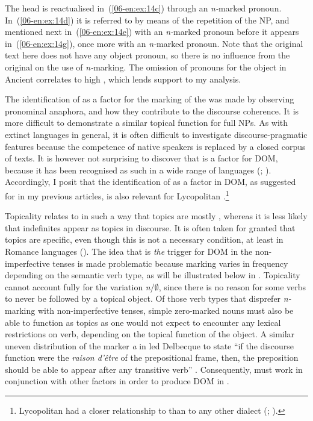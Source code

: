 \documentclass[output=paper]{LSP/langsci}
\begin{document}
The head is reactualised in~(\ref{06-en:ex:14c}) through an \textit{n-}marked pronoun. In~(\ref{06-en:ex:14d}) it is referred to by means of the repetition of the NP, and mentioned next in~(\ref{06-en:ex:14e}) with an \textit{n-}marked pronoun before it appears in~(\ref{06-en:ex:14g}), once more with an \textit{n-}marked pronoun. Note that the original  text here does not have any object pronoun, so there is no influence from the original on the use of \textit{n-}marking. The omission of pronouns for the object in Ancient  correlates to high  \citep{Luraghi2003Greek}, which lends support to my analysis.

The identification of  as a factor for the marking of the  was made by observing pronominal anaphora, and how they contribute to the discourse coherence. It is more difficult to demonstrate a similar topical function for full NPs. As with extinct languages in general, it is often difficult to investigate discourse-pragmatic features because the competence of native speakers is replaced by a closed corpus of texts. It is however not surprising to discover that  is a factor for DOM, because it has been recognised as such in a wide range of languages (\citealt[125–139]{Dalrympleetal2011Objects}; \citealt{Escandell-Vidal2009Differential,Iemmolo2010Topicality, Shainetal2010Synchrony}). Accordingly, I posit that the identification of  as a factor in DOM, as suggested for   in my previous articles, is also relevant for Lycopolitan .\footnote{Lycopolitan had a closer relationship to  than to any other  dialect (\citealt{Funk1988Dialects}; \citealt[343]{Kasser2002Lyco-diospolitain}).}

Topicality relates to  in such a way that topics are mostly , whereas it is less likely that indefinites appear as topics in discourse. It is often taken for granted that topics are specific, even though this is not a necessary condition, at least in Romance languages (\citealt[138–140]{Leonetti2013Plurals}). The idea that  is \textit{the} trigger for DOM in the non-imperfective tenses is made problematic because marking varies in frequency depending on the semantic verb type, as will be illustrated below in . Topicality cannot account fully for the variation \textit{n}/${\emptyset}$, since there is no reason for some verbs to never be followed by a topical object. Of those verb types that disprefer \textit{n-}marking with non-imperfective tenses, simple zero-marked nouns must also be able to function as topics as one would not expect to encounter any lexical restrictions on verb, depending on the topical function of the object. A similar uneven distribution of the marker \textit{a} in  led Delbecque to state “if the discourse function were the \textit{raison d’être} of the prepositional frame, then, the preposition should be able to appear after any transitive verb” \citep[85]{Delbecque2002Construction}. Consequently,  must work in conjunction with other factors in order to produce DOM in .
\end{document}
